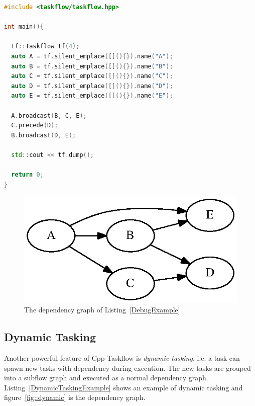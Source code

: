 \documentclass[sigconf]{acmart}
\begin{document}
\begin{lstlisting}[language=C++,label=DebugExample,caption={A debugging example.}]
#include <taskflow/taskflow.hpp>  

int main(){
  
  tf::Taskflow tf(4);  
  auto A = tf.silent_emplace([](){}).name("A");
  auto B = tf.silent_emplace([](){}).name("B");
  auto C = tf.silent_emplace([](){}).name("C");
  auto D = tf.silent_emplace([](){}).name("D");
  auto E = tf.silent_emplace([](){}).name("E");
  
  A.broadcast(B, C, E); 
  C.precede(D);
  B.broadcast(D, E); 
  
  std::cout << tf.dump();

  return 0;
}
\end{lstlisting} 

\begin{figure}[htb]
 \centering
 \includegraphics[width=.6\columnwidth]{Fig/debug.eps}
  \caption{
    The dependency graph of Listing~\ref{DebugExample}.
  }
 \label{fig::debug}
\end{figure}


\subsection{Dynamic Tasking}
Another powerful feature of Cpp-Taskflow is \emph{dynamic tasking}, i.e. a task can spawn 
new tasks with dependency during execution. The new tasks are grouped into a subflow graph 
and executed as a normal dependency graph. Listing~\ref{DynamicTaskingExample} shows an 
example of dynamic tasking and figure~\ref{fig::dynamic} is the dependency graph.
\end{document}
